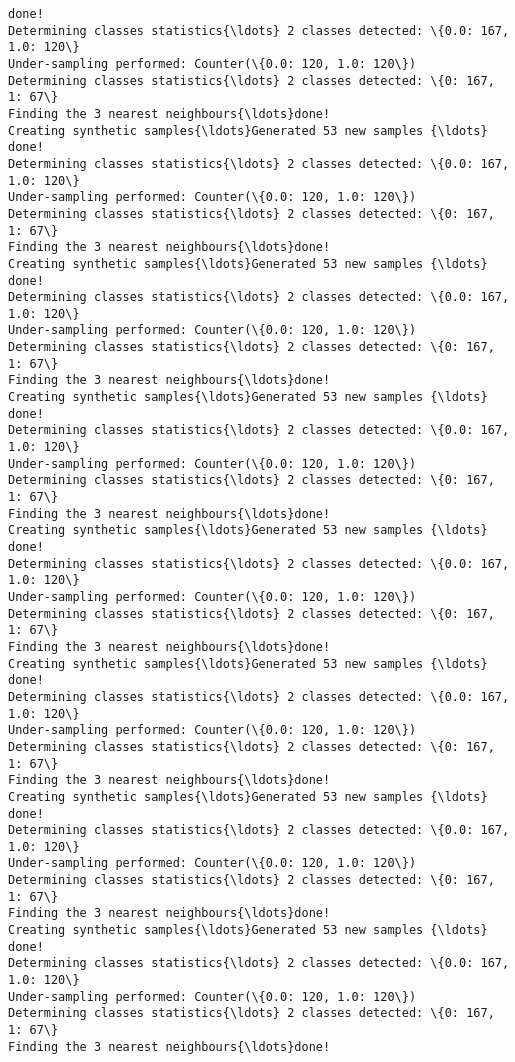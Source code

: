 \documentclass{article}
\begin{document}
\begin{Verbatim}[commandchars=\\\{\}]
done!
Determining classes statistics{\ldots} 2 classes detected: \{0.0: 167, 1.0: 120\}
Under-sampling performed: Counter(\{0.0: 120, 1.0: 120\})
Determining classes statistics{\ldots} 2 classes detected: \{0: 167, 1: 67\}
Finding the 3 nearest neighbours{\ldots}done!
Creating synthetic samples{\ldots}Generated 53 new samples {\ldots}
done!
Determining classes statistics{\ldots} 2 classes detected: \{0.0: 167, 1.0: 120\}
Under-sampling performed: Counter(\{0.0: 120, 1.0: 120\})
Determining classes statistics{\ldots} 2 classes detected: \{0: 167, 1: 67\}
Finding the 3 nearest neighbours{\ldots}done!
Creating synthetic samples{\ldots}Generated 53 new samples {\ldots}
done!
Determining classes statistics{\ldots} 2 classes detected: \{0.0: 167, 1.0: 120\}
Under-sampling performed: Counter(\{0.0: 120, 1.0: 120\})
Determining classes statistics{\ldots} 2 classes detected: \{0: 167, 1: 67\}
Finding the 3 nearest neighbours{\ldots}done!
Creating synthetic samples{\ldots}Generated 53 new samples {\ldots}
done!
Determining classes statistics{\ldots} 2 classes detected: \{0.0: 167, 1.0: 120\}
Under-sampling performed: Counter(\{0.0: 120, 1.0: 120\})
Determining classes statistics{\ldots} 2 classes detected: \{0: 167, 1: 67\}
Finding the 3 nearest neighbours{\ldots}done!
Creating synthetic samples{\ldots}Generated 53 new samples {\ldots}
done!
Determining classes statistics{\ldots} 2 classes detected: \{0.0: 167, 1.0: 120\}
Under-sampling performed: Counter(\{0.0: 120, 1.0: 120\})
Determining classes statistics{\ldots} 2 classes detected: \{0: 167, 1: 67\}
Finding the 3 nearest neighbours{\ldots}done!
Creating synthetic samples{\ldots}Generated 53 new samples {\ldots}
done!
Determining classes statistics{\ldots} 2 classes detected: \{0.0: 167, 1.0: 120\}
Under-sampling performed: Counter(\{0.0: 120, 1.0: 120\})
Determining classes statistics{\ldots} 2 classes detected: \{0: 167, 1: 67\}
Finding the 3 nearest neighbours{\ldots}done!
Creating synthetic samples{\ldots}Generated 53 new samples {\ldots}
done!
Determining classes statistics{\ldots} 2 classes detected: \{0.0: 167, 1.0: 120\}
Under-sampling performed: Counter(\{0.0: 120, 1.0: 120\})
Determining classes statistics{\ldots} 2 classes detected: \{0: 167, 1: 67\}
Finding the 3 nearest neighbours{\ldots}done!
Creating synthetic samples{\ldots}Generated 53 new samples {\ldots}
done!
Determining classes statistics{\ldots} 2 classes detected: \{0.0: 167, 1.0: 120\}
Under-sampling performed: Counter(\{0.0: 120, 1.0: 120\})
Determining classes statistics{\ldots} 2 classes detected: \{0: 167, 1: 67\}
Finding the 3 nearest neighbours{\ldots}done!

\end{Verbatim}
\end{document}
